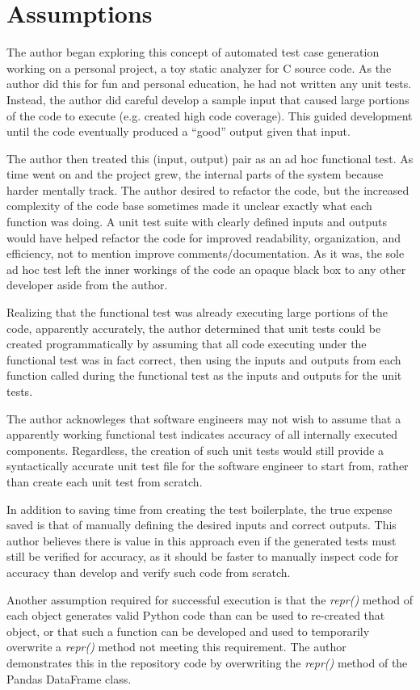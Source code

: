 \section{Assumptions}\label{sec:introduction}

The author began exploring this concept of automated test case generation
 working on a personal project, a toy static analyzer for C source code.  As the
 author did this for fun and personal education, he had not written any unit
 tests.  Instead, the author did careful develop a sample input that caused large
 portions of the code to execute (e.g. created high code coverage).  This guided
 development until the code eventually produced a “good” output given that input.
  
 The author then treated this (input, output) pair as an ad hoc functional test.
  As time went on and the project grew, the internal parts of the system because
 harder mentally track.  The author desired to refactor the code, but the
 increased complexity of the code base sometimes made it unclear exactly what
 each function was doing.  A unit test suite with clearly defined inputs and
 outputs would have helped refactor the code for improved readability,
 organization, and efficiency, not to mention improve comments/documentation.  As
 it was, the sole ad hoc test left the inner workings of the code an opaque black
 box to any other developer aside from the author.

Realizing that the functional test was already executing large portions of the
 code, apparently accurately, the author determined that unit tests could be
 created programmatically by assuming that all code executing under the
 functional test was in fact correct, then using the inputs and outputs from each
 function called during the functional test as the inputs and outputs for the
 unit tests.  
 
 The author acknowleges that software engineers may not 
 wish to assume that a apparently working functional test indicates accuracy of 
 all internally executed components. Regardless, the creation of such unit 
 tests would still provide a syntactically accurate unit
 test file for the software engineer to start from, rather than create each unit
 test from scratch.  
 
 In addition to saving time from creating the test
 boilerplate, the true expense saved is that of manually defining the desired
 inputs and correct outputs.  This author believes there is value in this
 approach even if the generated tests must still be verified for accuracy, as it
 should be faster to manually inspect code for accuracy than develop and verify
 such code from scratch.

Another assumption required for successful execution is that the \textit{repr()} method
 of each object generates valid Python code than can be used to re-created that
 object, or that such a function can be developed and used to temporarily
 overwrite a \textit{repr()} method not meeting this requirement.  The author demonstrates
 this in the repository code by overwriting the \textit{repr()} method of the
 Pandas DataFrame class.